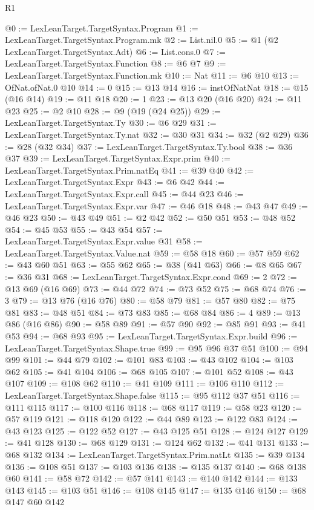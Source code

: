 \begin{lexlean}{R1}
\begin{coremodule}
@0 := LexLeanTarget.TargetSyntax.Program
@1 := LexLeanTarget.TargetSyntax.Program.mk
@2 := List.nil.{0}
@5 := @1 (@2 LexLeanTarget.TargetSyntax.Adt)
@6 := List.cons.{0}
@7 := LexLeanTarget.TargetSyntax.Function
@8 := @6 @7
@9 := LexLeanTarget.TargetSyntax.Function.mk
@10 := Nat
@11 := @6 @10
@13 := OfNat.ofNat.{0} @10
@14 := 0
@15 := @13 @14
@16 := instOfNatNat
@18 := @15 (@16 @14)
@19 := @11 @18
@20 := 1
@23 := @13 @20 (@16 @20)
@24 := @11 @23
@25 := @2 @10
@28 := @9 (@19 (@24 @25))
@29 := LexLeanTarget.TargetSyntax.Ty
@30 := @6 @29
@31 := LexLeanTarget.TargetSyntax.Ty.nat
@32 := @30 @31
@34 := @32 (@2 @29)
@36 := @28 (@32 @34)
@37 := LexLeanTarget.TargetSyntax.Ty.bool
@38 := @36 @37
@39 := LexLeanTarget.TargetSyntax.Expr.prim
@40 := LexLeanTarget.TargetSyntax.Prim.natEq
@41 := @39 @40
@42 := LexLeanTarget.TargetSyntax.Expr
@43 := @6 @42
@44 := LexLeanTarget.TargetSyntax.Expr.call
@45 := @44 @23
@46 := LexLeanTarget.TargetSyntax.Expr.var
@47 := @46 @18
@48 := @43 @47
@49 := @46 @23
@50 := @43 @49
@51 := @2 @42
@52 := @50 @51
@53 := @48 @52
@54 := @45 @53
@55 := @43 @54
@57 := LexLeanTarget.TargetSyntax.Expr.value @31
@58 := LexLeanTarget.TargetSyntax.Value.nat
@59 := @58 @18
@60 := @57 @59
@62 := @43 @60 @51
@63 := @55 @62
@65 := @38 (@41 @63)
@66 := @8 @65
@67 := @36 @31
@68 := LexLeanTarget.TargetSyntax.Expr.cond
@69 := 2
@72 := @13 @69 (@16 @69)
@73 := @44 @72
@74 := @73 @52
@75 := @68 @74
@76 := 3
@79 := @13 @76 (@16 @76)
@80 := @58 @79
@81 := @57 @80
@82 := @75 @81
@83 := @48 @51
@84 := @73 @83
@85 := @68 @84
@86 := 4
@89 := @13 @86 (@16 @86)
@90 := @58 @89
@91 := @57 @90
@92 := @85 @91
@93 := @41 @53
@94 := @68 @93
@95 := LexLeanTarget.TargetSyntax.Expr.build
@96 := LexLeanTarget.TargetSyntax.Shape.true
@99 := @95 @96 @37 @51
@100 := @94 @99
@101 := @44 @79
@102 := @101 @83
@103 := @43 @102
@104 := @103 @62
@105 := @41 @104
@106 := @68 @105
@107 := @101 @52
@108 := @43 @107
@109 := @108 @62
@110 := @41 @109
@111 := @106 @110
@112 := LexLeanTarget.TargetSyntax.Shape.false
@115 := @95 @112 @37 @51
@116 := @111 @115
@117 := @100 @116
@118 := @68 @117
@119 := @58 @23
@120 := @57 @119
@121 := @118 @120
@122 := @44 @89
@123 := @122 @83
@124 := @43 @123
@125 := @122 @52
@127 := @43 @125 @51
@128 := @124 @127
@129 := @41 @128
@130 := @68 @129
@131 := @124 @62
@132 := @41 @131
@133 := @68 @132
@134 := LexLeanTarget.TargetSyntax.Prim.natLt
@135 := @39 @134
@136 := @108 @51
@137 := @103 @136
@138 := @135 @137
@140 := @68 @138 @60
@141 := @58 @72
@142 := @57 @141
@143 := @140 @142
@144 := @133 @143
@145 := @103 @51
@146 := @108 @145
@147 := @135 @146
@150 := @68 @147 @60 @142

\end{coremodule}
\end{lexlean}
